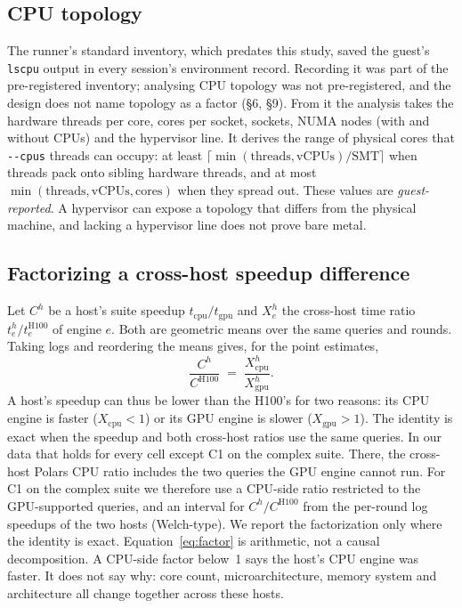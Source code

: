 \documentclass[11pt]{article}
\begin{document}
\subsection{CPU topology}
\label{sec:topology-method}

The runner's standard inventory, which predates this study, saved the guest's
\texttt{lscpu} output in every session's environment record. Recording it was
part of the pre-registered inventory; analysing CPU topology was not
pre-registered, and the design does not name topology as a factor (\S6,
\S9). From it the analysis
takes the hardware threads per core, cores per socket, sockets, NUMA nodes
(with and without CPUs) and the hypervisor line. It derives the range of
physical cores that \texttt{-{}-cpus} threads can occupy: at least
$\lceil \min(\text{threads},\text{vCPUs})/\text{SMT}\rceil$ when threads pack
onto sibling hardware threads, and at most
$\min(\text{threads},\text{vCPUs},\text{cores})$ when they spread out. These
values are \emph{guest-reported}. A hypervisor can expose a topology that
differs from the physical machine, and lacking a hypervisor line does not
prove bare metal.

\subsection{Factorizing a cross-host speedup difference}
\label{sec:factor}

Let $C^{h}$ be a host's suite speedup $t_{\text{cpu}}/t_{\text{gpu}}$ and
$X^{h}_{e}$ the cross-host time ratio $t^{h}_{e}/t^{\text{H100}}_{e}$ of engine
$e$. Both are geometric means over the same queries and rounds. Taking logs and
reordering the means gives, for the point estimates,
\begin{equation}
  \frac{C^{h}}{C^{\text{H100}}} \;=\; \frac{X^{h}_{\text{cpu}}}{X^{h}_{\text{gpu}}}.
  \label{eq:factor}
\end{equation}
A host's speedup can thus be lower than the H100's for two reasons: its CPU
engine is faster ($X_{\text{cpu}}<1$) or its GPU engine is slower
($X_{\text{gpu}}>1$). The identity is exact when the speedup and both
cross-host ratios use the same queries. In our data that holds for every cell
except C1 on the complex suite. There, the cross-host Polars CPU ratio
includes the two queries the GPU engine cannot run.
\ifdecomp
For C1 on the complex suite we therefore use a CPU-side ratio restricted to
the GPU-supported queries, and an interval for $C^{h}/C^{\text{H100}}$ from the
per-round log speedups of the two hosts (Welch-type).
\fi
\ifdecomp\else
We report the factorization only where the identity is exact.
\fi
Equation~\eqref{eq:factor} is arithmetic, not a causal decomposition. A CPU-side
factor below~1 says the host's CPU engine was faster. It does not say why: core
count, microarchitecture, memory system and architecture all change together
across these hosts.
\end{document}
